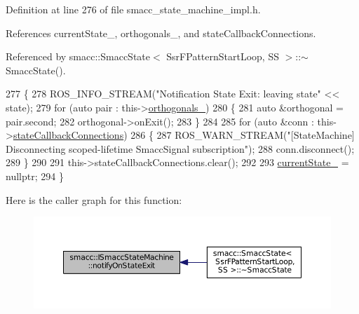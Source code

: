 Definition at line 276 of file smacc\+\_\+state\+\_\+machine\+\_\+impl.\+h.



References current\+State\+\_\+, orthogonals\+\_\+, and state\+Callback\+Connections.



Referenced by smacc\+::\+Smacc\+State$<$ Ssr\+F\+Pattern\+Start\+Loop, S\+S $>$\+::$\sim$\+Smacc\+State().


\begin{DoxyCode}
277 \{
278     ROS\_INFO\_STREAM(\textcolor{stringliteral}{"Notification State Exit: leaving state"} << state);
279     \textcolor{keywordflow}{for} (\textcolor{keyword}{auto} pair : this->\hyperlink{classsmacc_1_1ISmaccStateMachine_ae8e5c25d0aecd91fe496df13751bc667}{orthogonals\_})
280     \{
281         \textcolor{keyword}{auto} &orthogonal = pair.second;
282         orthogonal->onExit();
283     \}
284 
285     \textcolor{keywordflow}{for} (\textcolor{keyword}{auto} &conn : this->\hyperlink{classsmacc_1_1ISmaccStateMachine_aaf98bb0edaa5d8c84767e4acfad3548d}{stateCallbackConnections})
286     \{
287         ROS\_WARN\_STREAM(\textcolor{stringliteral}{"[StateMachine] Disconnecting scoped-lifetime SmaccSignal subscription"});
288         conn.disconnect();
289     \}
290 
291     this->stateCallbackConnections.clear();
292 
293     \hyperlink{classsmacc_1_1ISmaccStateMachine_a9c6e7745205bcce80a301f2fbe8f7e99}{currentState\_} = \textcolor{keyword}{nullptr};
294 \}
\end{DoxyCode}


Here is the caller graph for this function\+:
\nopagebreak
\begin{figure}[H]
\begin{center}
\leavevmode
\includegraphics[width=350pt]{classsmacc_1_1ISmaccStateMachine_a9d2bd4aca0c80a1ec22c5f95e7c38db8_icgraph}
\end{center}
\end{figure}


